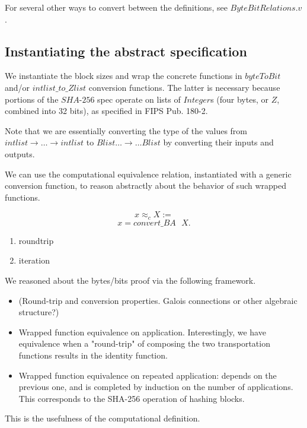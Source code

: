 \documentclass[twocolumn,showpacs,%
  nofootinbib,aps,superscriptaddress,%
  eqsecnum,prd,notitlepage,showkeys,10pt]{revtex4-1}
\begin{document}
For several other ways to convert between the definitions, see $ByteBitRelations.v$.


\subsection{Instantiating the abstract specification}

We instantiate the block sizes and wrap the concrete functions in $byteToBit$ and/or $intlist\_to\_Zlist$ conversion functions. The latter is necessary because portions of the $SHA$-$256$ spec operate on lists of $Integer$s (four bytes, or $Z$, combined into 32 bits), as specified in FIPS Pub. 180-2.



Note that we are essentially converting the type of the values from $intlist \rightarrow \ldots \rightarrow intlist$ to $Blist \ldots \rightarrow \ldots Blist$ by converting their inputs and outputs.

We can use the computational equivalence relation, instantiated with a generic conversion function, to reason abstractly about the behavior of such wrapped functions.

$$x \approx_c X :=$$ $$x = convert\_BA \textrm{ } X.$$ 

\begin{enumerate}
\item roundtrip
\item iteration
\end{enumerate}

We reasoned about the bytes/bits proof via the following framework.

\begin{itemize}
\item (Round-trip and conversion properties. Galois connections or other algebraic structure?)
\item Wrapped function equivalence on application. Interestingly, we have equivalence when a "round-trip" of composing the two transportation functions results in the identity function.
\item Wrapped function equivalence on repeated application: depends on the previous one, and is completed by induction on the number of applications. This corresponds to the SHA-256 operation of hashing blocks.
\end{itemize}

This is the usefulness of the computational definition.
\end{document}

